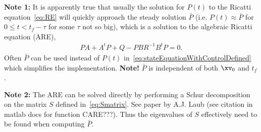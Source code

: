 \documentclass[11pt]{article}
\begin{document}
{\bf Note 1:} It is apparently true that usually the solution for $P(t)$ to the Ricatti equation~\eqref{eq:RE}
will quickly approach the steady solution $\bar{P}$ (i.e. $P(t)\approx \bar{P}$ for $0\le t < t_f-\tau$ for some $\tau$ not so big), 
which is a solution to the algebraic Ricatti equation (ARE),
\begin{align}
   P A + A^t P + Q - P B R^{-1} B^t P = 0 .  \label{eq:ARE}
\end{align}
Often $\bar{P}$ can be used instead of $P(t)$ in~\eqref{eq:stateEquationWithControlDefined} which simplifies
the implementation. {\bf Note!}  $\bar{P}$ is independent of both $\xv_0$ and $t_f$. 


{\bf Note 2:} The ARE can be solved directly by performing a Schur decomposition on the matrix $S$ defined
in~\eqref{eq:Smatrix}. See paper by A.J. Laub (see citation in matlab docs for function CARE???). Thus the eigenvalues
of $S$ effectively need to be found when computing $\bar{P}$. 

\vfill\eject


\end{document}
